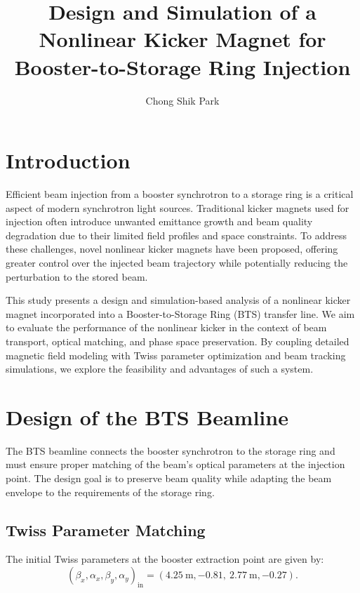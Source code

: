\documentclass[a4paper,11pt]{article}
\title{Design and Simulation of a Nonlinear Kicker Magnet for Booster-to-Storage Ring Injection}
\author[a]{Chong Shik Park}
\affiliation[a]{Department of Accelerator Science, Korea University, Sejong, 30019 South Korea}
\begin{document}
\maketitle
\flushbottom

\section{Introduction}

Efficient beam injection from a booster synchrotron to a storage ring is a critical aspect of modern synchrotron light sources. Traditional kicker magnets used for injection often introduce unwanted emittance growth and beam quality degradation due to their limited field profiles and space constraints. To address these challenges, novel nonlinear kicker magnets have been proposed, offering greater control over the injected beam trajectory while potentially reducing the perturbation to the stored beam.

This study presents a design and simulation-based analysis of a nonlinear kicker magnet incorporated into a Booster-to-Storage Ring (BTS) transfer line. We aim to evaluate the performance of the nonlinear kicker in the context of beam transport, optical matching, and phase space preservation. By coupling detailed magnetic field modeling with Twiss parameter optimization and beam tracking simulations, we explore the feasibility and advantages of such a system.

\section{Design of the BTS Beamline}

The BTS beamline connects the booster synchrotron to the storage ring and must ensure proper matching of the beam's optical parameters at the injection point. The design goal is to preserve beam quality while adapting the beam envelope to the requirements of the storage ring.

\subsection{Twiss Parameter Matching}

The initial Twiss parameters at the booster extraction point are given by:
\begin{equation}
    (\beta_x, \alpha_x, \beta_y, \alpha_y)_{\text{in}} = (4.25\ \mathrm{m}, -0.81,\ 2.77\ \mathrm{m}, -0.27).
\end{equation}
\end{document}
